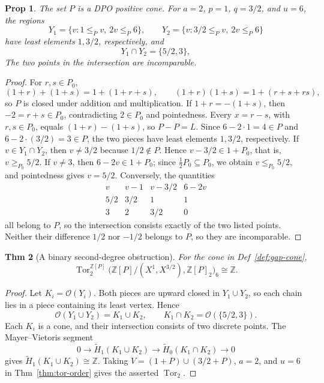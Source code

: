 \documentclass[10pt,letterpaper]{amsart}
\numberwithin{equation}{section}
\newtheorem{thm}{Thm}[section]
\newtheorem{prop}[thm]{Prop}
\theoremstyle{definition}
\newcommand{\Z}{\mathbb Z}
\newcommand{\Tor}{\operatorname{Tor}}
\newcommand{\ord}{\mathcal O}
\begin{document}
\begin{prop}\label{prop:gap-dpo}
The set $P$ is a DPO positive cone. For $a=2$, $p=1$, $q=3/2$, and $u=6$, the regions
\[
Y_1=\{v:1\le_Pv,\ 2v\le_P6\},\qquad
Y_2=\{v:3/2\le_Pv,\ 2v\le_P6\}
\]
have least elements $1,3/2$, respectively, and
\[
Y_1\cap Y_2=\{5/2,3\},
\]
The two points in the intersection are incomparable.
\end{prop}
\begin{proof}
For $r,s\in P_0$,
\[
(1+r)+(1+s)=1+(1+r+s),\qquad
(1+r)(1+s)=1+(r+s+rs),
\]
so $P$ is closed under addition and multiplication. If $1+r=-(1+s)$, then $-2=r+s\in P_0$, contradicting $2\in P_0$ and pointedness. Every $x=r-s$, with $r,s\in P_0$, equals $(1+r)-(1+s)$, so $P-P=L$.
Since $6-2\cdot1=4\in P$ and $6-2\cdot(3/2)=3\in P$, the two pieces have least elements $1,3/2$, respectively.
If $v\in Y_1\cap Y_2$, then $v\ne3/2$ because $1/2\notin P$. Hence $v-3/2\in1+P_0$, that is, $v\ge_{P_0}5/2$. If $v\ne3$, then $6-2v\in1+P_0$; since $\tfrac12P_0\subseteq P_0$, we obtain $v\le_{P_0}5/2$, and pointedness gives $v=5/2$.
Conversely, the quantities
\[
\begin{array}{c|ccc}
v&v-1&v-3/2&6-2v\\\hline
5/2&3/2&1&1\\
3&2&3/2&0
\end{array}
\]
all belong to $P$, so the intersection consists exactly of the two listed points. Neither their difference $1/2$ nor $-1/2$ belongs to $P$, so they are incomparable.
\end{proof}

\begin{thm}[A binary second-degree obstruction]\label{thm:gap-tor}
For the cone in Def~\ref{def:gap-cone},
\[
\Tor_2^{\Z[P]}\bigl(\Z[P]/(X^1,X^{3/2}),\Z[P]_2\bigr)_6\cong\Z.
\]
\end{thm}
\begin{proof}
Let $K_i=\ord(Y_i)$. Both pieces are upward closed in $Y_1\cup Y_2$, so each chain lies in a piece containing its least vertex. Hence
\[
\ord(Y_1\cup Y_2)=K_1\cup K_2,\qquad
K_1\cap K_2=\ord(\{5/2,3\}).
\]
Each $K_i$ is a cone, and their intersection consists of two discrete points. The Mayer--Vietoris segment
\[
0\longrightarrow\widetilde H_1(K_1\cup K_2)
\longrightarrow\widetilde H_0(K_1\cap K_2)
\longrightarrow0
\]
gives $\widetilde H_1(K_1\cup K_2)\cong\Z$. Taking $V=(1+P)\cup(3/2+P)$, $a=2$, and $u=6$ in Thm~\ref{thm:tor-order} gives the asserted $\Tor_2$.
\end{proof}
\end{document}
